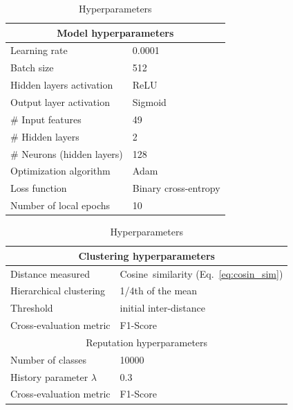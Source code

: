 \begin{table}[]
    \begin{subtable}{.45\linewidth}
    \centering
    \begin{tabular}{l|l}
        \toprule %
        \multicolumn{2}{c}{Model hyperparameters} \\
       \midrule %
         Learning rate & 0.0001 \\
        Batch size & 512 \\
        Hidden layers activation & ReLU \\
        Output layer activation & Sigmoid \\
        \# Input features & 49 \\
        \# Hidden layers & 2 \\ 
        \# Neurons (hidden layers) & 128 \\
        Optimization algorithm & Adam \\
        Loss function & Binary cross-entropy \\
        Number of local epochs & 10 \\
        \bottomrule %
    \end{tabular}
    \end{subtable}%
    \begin{subtable}{.45\linewidth}
    \centering
    \begin{tabular}{l|l}
        \toprule %
        \multicolumn{2}{c}{Clustering hyperparameters}\\
        \midrule %
        Distance measured & Cosine~similarity (Eq.~\ref{eq:cosin_sim}) \\
        Hierarchical clustering & 1/4th of the mean \\
        Threshold &  initial inter-distance\\
        Cross-evaluation metric & F1-Score \\
        \midrule %
        \multicolumn{2}{c}{Reputation hyperparameters}\\
        \midrule %
        Number of classes & 10000 \\
        History parameter $\lambda$ & 0.3 \\ 
        Cross-evaluation metric & F1-Score \\
       \bottomrule %
    \end{tabular}
    \end{subtable}
    
    \label{tbl:hyperparameters}
    \caption{Hyperparameters}


\end{table}


